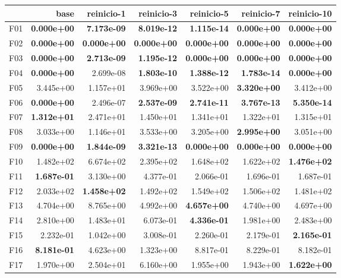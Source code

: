 \begin{tabular}{lrrrrrr}
\toprule
\textbf{} & \textbf{base} & \textbf{reinicio-1} & \textbf{reinicio-3} & \textbf{reinicio-5} & \textbf{reinicio-7} & \textbf{reinicio-10} \\
\midrule
F01 & \textbf{0.000e+00} & \textbf{7.173e-09} & \textbf{8.019e-12} & \textbf{1.115e-14} & \textbf{0.000e+00} & \textbf{0.000e+00} \\
F02 & \textbf{0.000e+00} & \textbf{0.000e+00} & \textbf{0.000e+00} & \textbf{0.000e+00} & \textbf{0.000e+00} & \textbf{0.000e+00} \\
F03 & \textbf{0.000e+00} & \textbf{2.713e-09} & \textbf{1.195e-12} & \textbf{0.000e+00} & \textbf{0.000e+00} & \textbf{0.000e+00} \\
F04 & \textbf{0.000e+00} & 2.699e-08 & \textbf{1.803e-10} & \textbf{1.388e-12} & \textbf{1.783e-14} & \textbf{0.000e+00} \\
F05 & 3.445e+00 & 1.157e+01 & 3.969e+00 & 3.522e+00 & \textbf{3.320e+00} & 3.412e+00 \\
F06 & \textbf{0.000e+00} & 2.496e-07 & \textbf{2.537e-09} & \textbf{2.741e-11} & \textbf{3.767e-13} & \textbf{5.350e-14} \\
F07 & \textbf{1.312e+01} & 2.471e+01 & 1.450e+01 & 1.341e+01 & 1.322e+01 & 1.315e+01 \\
F08 & 3.033e+00 & 1.146e+01 & 3.533e+00 & 3.205e+00 & \textbf{2.995e+00} & 3.051e+00 \\
F09 & \textbf{0.000e+00} & \textbf{1.844e-09} & \textbf{3.321e-13} & \textbf{0.000e+00} & \textbf{0.000e+00} & \textbf{0.000e+00} \\
F10 & 1.482e+02 & 6.674e+02 & 2.395e+02 & 1.648e+02 & 1.622e+02 & \textbf{1.476e+02} \\
F11 & \textbf{1.687e-01} & 3.130e+00 & 4.377e-01 & 2.066e-01 & 1.696e-01 & 1.687e-01 \\
F12 & 2.033e+02 & \textbf{1.458e+02} & 1.492e+02 & 1.549e+02 & 1.506e+02 & 1.481e+02 \\
F13 & 4.704e+00 & 8.765e+00 & 4.992e+00 & \textbf{4.657e+00} & 4.740e+00 & 4.697e+00 \\
F14 & 2.810e+00 & 1.483e+01 & 6.073e-01 & \textbf{4.336e-01} & 1.981e+00 & 2.483e+00 \\
F15 & 2.232e-01 & 1.042e+00 & 3.008e-01 & 2.260e-01 & 2.179e-01 & \textbf{2.165e-01} \\
F16 & \textbf{8.181e-01} & 4.623e+00 & 1.323e+00 & 8.817e-01 & 8.229e-01 & 8.182e-01 \\
F17 & 1.970e+00 & 2.504e+01 & 6.160e+00 & 1.955e+00 & 1.943e+00 & \textbf{1.622e+00} \\

\end{tabular}
